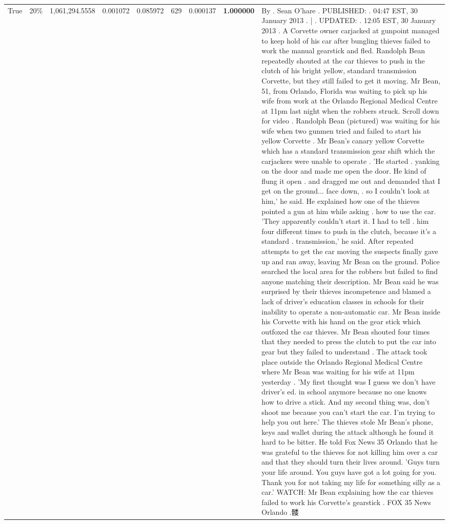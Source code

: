 \begin{table}[H]
\begin{tabular}{llrrrrrrl}
\multirow[c]{16}{*}{True} & 20\% & 1,061,294.5558 & 0.001072 & 0.085972 & \color{red} 629 & 0.000137 & \bfseries \color{red} 1.000000 & By . Sean O'hare . PUBLISHED: . 04:47 EST, 30 January 2013 . | . UPDATED: . 12:05 EST, 30 January 2013 . A Corvette owner carjacked at gunpoint managed to keep hold of his car after bungling thieves failed to work the manual gearstick and fled. Randolph Bean repeatedly shouted at the car thieves to push in the clutch of his bright yellow, standard transmission Corvette, but they still failed to get it moving. Mr Bean, 51, from Orlando, Florida was waiting to pick up his wife from work at the Orlando Regional Medical Centre at 11pm last night when the robbers struck. Scroll down for video . Randolph Bean (pictured) was waiting for his wife when two gunmen tried and failed to start his yellow Corvette . Mr Bean's canary yellow Corvette which has a standard transmission gear shift which the carjackers were unable to operate . 'He started . yanking on the door and made me open the door. He kind of flung it open . and dragged me out and demanded that I get on the ground... face down, . so I couldn't look at him,' he said. He explained how one of the thieves pointed a gun at him while asking . how to use the car. 'They apparently couldn't start it. I had to tell . him four different times to push in the clutch, because it's a standard . transmission,' he said. After repeated attempts to get the car moving the suspects finally gave up and ran away, leaving Mr Bean on the ground. Police searched the local area for the robbers but failed to find anyone matching their description. Mr Bean said he was surprised by their thieves incompetence and blamed a lack of driver's education classes in schools for their inability to operate a non-automatic car. Mr Bean inside his Corvette with his hand on the gear stick which outfoxed the car thieves. Mr Bean shouted four times that they needed to press the clutch to put the car into gear but they failed to understand . The attack took place outside the Orlando Regional Medical Centre where Mr Bean was waiting for his wife at 11pm yesterday . 'My first thought was I guess we don't have driver's ed. in school anymore because no one knows how to drive a stick. And my second thing was, don't shoot me because you can't start the car. I'm trying to help you out here.' The thieves stole Mr Bean's phone, keys and wallet during the attack although he found it hard to be bitter. He told Fox News 35 Orlando that he was grateful to the thieves for not killing him over a car and that they should turn their lives around. 'Guys turn your life around. You guys have got a lot going for you. Thank you for not taking my life for something silly as a car.' WATCH: Mr Bean explaining how the car thieves failed to work his Corvette's gearstick . FOX 35 News Orlando .髅 \\

\end{tabular}
\end{table}
